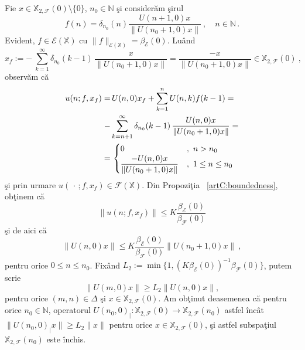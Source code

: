 \documentclass[ a4paper, 12pt]{report}
\newcommand{\E}{\mathcal{E}}
\newcommand{\F}{\mathcal{F}}
\newcommand{\N}{\mathbb{N}}
\newcommand{\X}{\mathbb{X}}
\theoremstyle{definition}
\theoremstyle{remark}
\numberwithin{equation}{section}
\begin{document}
Fie $x\in\X_{2,\F}(0)\setminus\{0\}$, $n_0\in\N$ \c si consider\u am \c sirul
\begin{equation}
f(n)=\delta_{n_0}(n) \frac{U(n+1,0)x}{\|U(n_0+1,0)x\|}\ ,\quad n\in\N\,.
\end{equation}
Evident, $f\in\E(\X)$ cu $\|f\|_{\E(\X)}=\beta_{\E}(0)$.
Lu\^and
\begin{equation}
x_f:= -\ \sum_{k=1}^{\infty}\delta_{n_0}(k-1) \,\frac{x}{\|U(n_0+1,0)x\|} = \frac{-x}{\|U(n_0+1,0)x\|}\in \X_{2,\F}(0)\ ,
\end{equation}
observ\u am c\u a
\begin{gather}
\begin{split}
u(n;f,x_f)=&\, U(n,0)x_f +\sum_{k=1}^{n} U(n,k)f(k-1)=\\
 -&  \sum_{k=n+1}^{\infty}\delta_{n_0}(k-1)\,\frac{U(n,0)x}{\|U(n_0+1,0)x\|} = \\
 =&\, \begin{cases}
 0 &,\ n>n_0\\
 \displaystyle\frac{-U(n,0)x}{\|U(n_0+1,0)x\|} &,\ 1\leq n\leq n_0
 \end{cases}
\end{split}
\end{gather}
\c si prin urmare $u(\,\cdot\,;f,x_f)\in \F(\X)$. Din Propozi\c tia ~\ref{artC:boundedness}, ob\c tinem c\u a
$$ \|u(n;f,x_f)\|\leq K\frac{\beta_{\E}(0)}{\beta_{\F}(0)}$$
\c si de aici c\u a
$$ \|U(n,0)x\|\leq K\frac{\beta_{\E}(0)}{\beta_{\F}(0)} \|U(n_0+1,0)x\|\ ,$$
pentru orice $0\leq n\leq n_0$. Fix\^and $L_2:=\min\{1,{(K\beta_{\E}(0))}^{-1}{\beta_{\F}(0)}\}$, putem scrie
\begin{equation}
\|U(m,0)x\|\geq L_2\|U(n,0)x\|,
\end{equation}
pentru orice $(m,n)\in\Delta$ \c si $x\in\X_{2,\F}(0)$.
Am ob\c tinut deasemenea c\u a pentru orice $n_0\in\N$, operatorul
$U(n_0,0)_{|}:\X_{2,\F}(0)\to\X_{2,\F}(n_0)$ astfel \^inc\^at $\|U(n_0,0)_{|}x\|\geq L_2\|x\|$ pentru orice
$x\in\X_{2,\F}(0)$, \c si astfel subspa\c tiul $\X_{2,\F}(n_0)$ este \^inchis.
\end{document}
